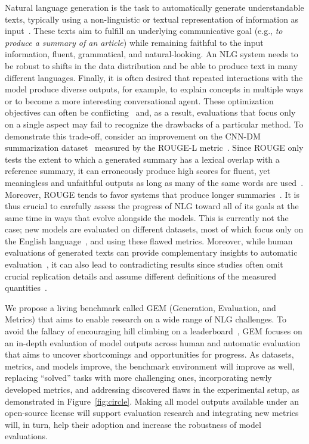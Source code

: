 \documentclass[11pt,a4paper]{article}
\newcommand{\GEM}{\textsc{GEM}}
\begin{document}
Natural language generation is the task to automatically generate understandable texts, typically using a non-linguistic or textual representation of information as input~\citep{reiter2000building}. These texts aim to fulfill an underlying communicative goal (e.g., \textit{to produce a summary of an article}) while remaining faithful to the input information, fluent, grammatical, and natural-looking. An NLG system needs to be robust to shifts in the data distribution and be able to produce text in many different languages. Finally, it is often desired that repeated interactions with the model produce diverse outputs, for example, to explain concepts in multiple ways or to become a more interesting conversational agent. These optimization objectives can often be conflicting~\citep{hashimoto2019unifying} and, as a result, evaluations that focus only on a single aspect may fail to recognize the drawbacks of a particular method. 
To demonstrate this trade-off, consider an improvement on the CNN-DM summarization dataset~\citep{hermann2015teaching,nallapati2016abstractive} measured by the ROUGE-L metric~\citep{lin2004rouge}.
Since ROUGE only tests the extent to which a generated summary has a lexical overlap with a reference summary, it can erroneously produce high scores for fluent, yet meaningless and unfaithful outputs as long as many of the same words are used~\citep{maynez2020faithfulness,gabriel2020go}. Moreover, ROUGE tends to favor systems that produce longer summaries~\citep{sun2019compare}. 
It is thus crucial to carefully assess the progress of NLG toward all of its goals at the same time in ways that evolve alongside the models. 
This is currently not the case; new models are evaluated on different datasets, most of which focus only on the English language~\citep{bender2019benderrule}, and using these flawed metrics. Moreover, while human evaluations of generated texts can provide complementary insights to automatic evaluation~\citep{manning2020human}, it can also lead to contradicting results since studies often omit crucial replication details and assume different definitions of the measured quantities~\citep{howcroft2020twenty}.

We propose a living benchmark called \GEM{} (Generation, Evaluation, and Metrics) that aims to enable research on a wide range of NLG challenges. To avoid the fallacy of encouraging hill climbing on a leaderboard~\citep{linzen2020accelerate}, \GEM{} focuses on an in-depth evaluation of model outputs across human and automatic evaluation that aims to uncover shortcomings and opportunities for progress. As datasets, metrics, and models improve, the benchmark environment will improve as well, replacing ``solved'' tasks with more challenging ones, incorporating newly developed metrics, and addressing discovered flaws in the experimental setup, as demonstrated in Figure~\ref{fig:circle}.
Making all model outputs available under an open-source license will support evaluation research and integrating new metrics will, in turn, help their adoption and increase the robustness of model evaluations. 
\end{document}
